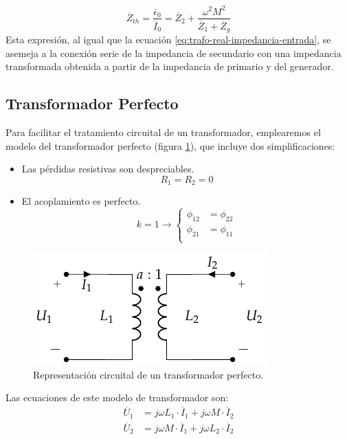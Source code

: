 \begin{equation}
  \label{eq:trafo-real-impedancia-thevenin}
  \boxed{\overline{Z}_{th} = \frac{\overline{\epsilon}_0}{\overline{I}_0} = \overline{Z}_2 + \frac{\omega^2 M^2}{\overline{Z}_1 + \overline{Z}_g}}
\end{equation}
Esta expresión, al igual que la ecuación
\ref{eq:trafo-real-impedancia-entrada}, se asemeja a la conexión serie
de la impedancia de secundario con una impedancia transformada
obtenida a partir de la impedancia de primario y del generador.

\subsection{Transformador Perfecto}
\label{sec:trafo-perfecto}

Para facilitar el tratamiento circuital de un transformador, emplearemos el modelo del transformador perfecto (figura \ref{fig:trafo-perfecto}), que incluye dos simplificaciones:
\begin{itemize}
\item Las pérdidas resistivas son despreciables.
  \[
    R_1 = R_2 = 0
  \]
\item El acoplamiento es perfecto.
  \[
    k = 1 \rightarrow \left\{
      \begin{array}{cc}
        \phi_{12} &= \phi_{22}\\
        \phi_{21} &= \phi_{11}\\
      \end{array} \right.
  \]
\end{itemize}

\begin{figure}
  \centering
  \includegraphics[height=0.15\textheight]{../figs/Trafo_Perfecto.pdf}
  \caption{Representación circuital de un transformador perfecto.}
  \label{fig:trafo-perfecto}
\end{figure}

Las ecuaciones de este modelo de transformador son:
\begin{align*}
  \overline{U}_1 &= j \omega L_1 \cdot \overline{I}_1 + j \omega M \cdot \overline{I}_2\\
  \overline{U}_2 &= j \omega M \cdot \overline{I}_1 + j \omega L_2 \cdot \overline{I}_2
\end{align*}

